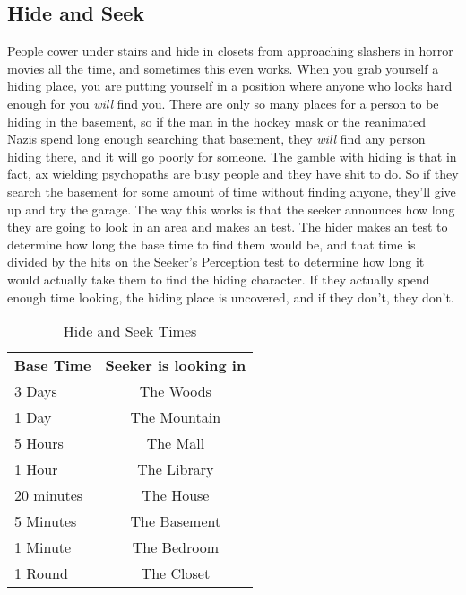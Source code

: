 \subsection{Hide and Seek} 
\hspace{\parindent} People cower under stairs and hide in closets from approaching slashers in horror movies all the time, and sometimes this even works. When you grab yourself a hiding place, you are putting yourself in a position where anyone who looks hard enough for you \textit{will} find you. There are only so many places for a person to be hiding in the basement, so if the man in the hockey mask or the reanimated Nazis spend long enough searching that basement, they \textit{will} find any person hiding there, and it will go poorly for someone. The gamble with hiding is that in fact, ax wielding psychopaths are busy people and they have shit to do. So if they search the basement for some amount of time without finding anyone, they'll give up and try the garage. The way this works is that the seeker announces how long they are going to look in an area and makes an  test. The hider makes an  test to determine how long the base time to find them would be, and that time is divided by the hits on the Seeker's Perception test to determine how long it would actually take them to find the hiding character. If they actually spend enough time looking, the hiding place is uncovered, and if they don't, they don't.

\begin{wraptable}[11]{R}{6.7cm} \vspace{-.45cm}
 \caption{Hide and Seek Times} \centering
\begin{tabular}{l c}
\textbf{Base Time}&\textbf{Seeker is looking in}\\
 3 Days&The Woods\\
 1 Day&The Mountain\\
 5 Hours&The Mall\\
 1 Hour&The Library\\
 20 minutes&The House\\
 5 Minutes&The Basement\\
 1 Minute&The Bedroom\\
 1 Round&The Closet\\
\end{tabular}
\end{wraptable}

